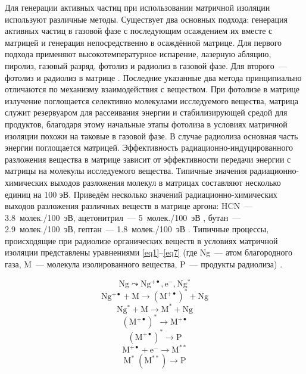 {Для генерации активных частиц при использовании матричной изоляции используют различные методы. Существует два основных подхода: генерация активных частиц в 
газовой фазе с последующим осаждением их вместе с матрицей и генерация непосредственно в осаждённой матрице. Для первого подхода применяют высокотемпературное испарение,
лазерную абляцию,
пиролиз,
газовый разряд,
фотолиз и радиолиз в газовой фазе. Для второго~--- фотолиз и радиолиз в матрице \cite{MI}.
Последние указанные два метода принципиально отличаются по механизму взаимодействия с веществом.
При фотолизе в матрице излучение поглощается селективно молекулами исследуемого вещества, матрица служит резервуаром для рассеивания энергии и стабилизирующей средой для продуктов, благодаря этому начальные этапы фотолиза в условиях матричной изоляции похожи на таковые в газовой фазе.  
В случае радиолиза основная часть энергии поглощается матрицей. Эффективность радиационно-индуцированного разложения вещества в матрице зависит от эффективности передачи энергии с матрицы на молекулы исследуемого вещества. Типичные значения радиационно-химических выходов разложения молекул в матрицах составляют несколько единиц на 100 эВ. Приведём несколько значений радиационно-химических выходов 
разложения различных веществ в матрице аргона: HCN~--- 3.8~молек./100~эВ, ацетонитрил~--- 5~молек./100~эВ \cite{Kameneve_diss}, бутан~--- 2.9~молек./100~эВ, гептан~--- 1.8~молек./100~эВ \cite{Feldman1999_}. Типичные процессы, происходящие при радиолизе органических веществ в условиях матричной изоляции представлены уравнениями \ref{eq1}--\ref{eq7} (где Ng~--- атом благородного газа, M~--- молекула изолированного вещества, P~--- продукты радиолиза) \cite{Feldman2014, Feldman1999_, Feldman1997}. 

\begin{equation}\label{eq1}
\mathrm{ 
Ng \leadsto Ng^{+\bullet}, e^-, Ng^*}
\end{equation}
\begin{equation}\label{eq2}
\mathrm{
Ng^{+\bullet} + M \to (M^{+\bullet})^* + Ng}
\end{equation}
\begin{equation}\label{eq3}
\mathrm{
Ng^* + M \to M^* + Ng}
\end{equation}
\begin{equation}\label{eq4}
\mathrm{
(M^{+\bullet})^* \to M^{+\bullet}}
\end{equation}
\begin{equation}\label{eq5}
\mathrm{
(M^{+\bullet})^* \to P}
\end{equation}
\begin{equation}\label{eq6}
\mathrm{
M^{+\bullet} + e^- \to M^{**}}
\end{equation}
\begin{equation}\label{eq7}
\mathrm{
M^* \;(M^{**})\to P}
\end{equation}

}
